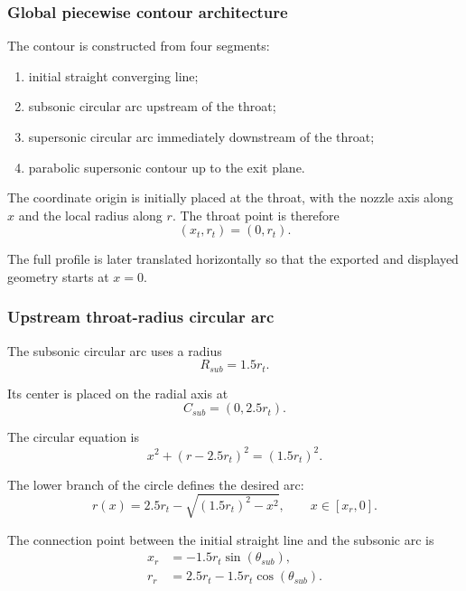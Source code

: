 \documentclass[11pt,a4paper]{article}
\begin{document}
\subsubsection{Global piecewise contour architecture}

The contour is constructed from four segments:
\begin{enumerate}
    \item initial straight converging line;
    \item subsonic circular arc upstream of the throat;
    \item supersonic circular arc immediately downstream of the throat;
    \item parabolic supersonic contour up to the exit plane.
\end{enumerate}

The coordinate origin is initially placed at the throat, with the nozzle axis along $x$ and the local radius along $r$. The throat point is therefore
\begin{equation}
(x_t,r_t)=(0,r_t).
\end{equation}

The full profile is later translated horizontally so that the exported and displayed geometry starts at $x=0$.

\subsubsection{Upstream throat-radius circular arc}

The subsonic circular arc uses a radius
\begin{equation}
R_{sub}=1.5r_t.
\end{equation}

Its center is placed on the radial axis at
\begin{equation}
C_{sub}=(0,2.5r_t).
\end{equation}

The circular equation is
\begin{equation}
x^2+(r-2.5r_t)^2=(1.5r_t)^2.
\end{equation}

The lower branch of the circle defines the desired arc:
\begin{equation}
r(x)=2.5r_t-\sqrt{(1.5r_t)^2-x^2},
\qquad x\in[x_r,0].
\label{eq:sub_arc}
\end{equation}

The connection point between the initial straight line and the subsonic arc is
\begin{align}
x_r &= -1.5r_t\sin(\theta_{sub}),
\label{eq:xr}\\
r_r &= 2.5r_t-1.5r_t\cos(\theta_{sub}).
\label{eq:yr}
\end{align}
\end{document}
